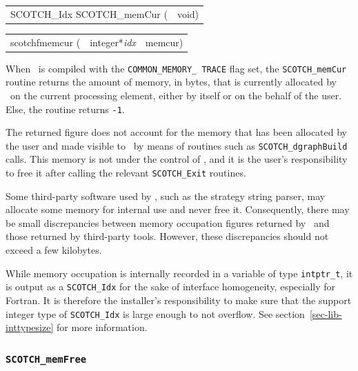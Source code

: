 \begin{itemize}
\progsyn

{\tt\begin{tabular}{l@{}l}
SCOTCH\_Idx SCOTCH\_memCur ( & void)
\end{tabular}}

{\tt\begin{tabular}{l@{}ll}
scotchfmemcur ( & integer*{\it idx} & memcur) \\

\end{tabular}}

\progdes

When \scotch\ is compiled with the {\tt COMMON\_\lbt MEMORY\_\lbt
TRACE} flag set, the {\tt SCOTCH\_memCur} routine returns the amount
of memory, in bytes, that is currently allocated by \scotch\ on the
current processing element, either by itself or on the behalf of the
user. Else, the routine returns {\tt -1}.

The returned figure does not account for the memory that has been
allocated by the user and made visible to \scotch\ by means of
routines such as {\tt SCOTCH\_\lbt dgraph\lbt Build} calls. This
memory is not under the control of \scotch, and it is the user's
responsibility to free it after calling the relevant
{\tt SCOTCH\_\lbt *\lbt Exit} routines.

Some third-party software used by \scotch, such as the strategy string
parser, may allocate some memory for internal use and never free it.
Consequently, there may be small discrepancies between memory
occupation figures returned by \scotch\ and those returned by
third-party tools. However, these discrepancies should not exceed a
few kilobytes.

While memory occupation is internally recorded in a variable of type
{\tt intptr\_\lbt t}, it is output as a {\tt SCOTCH\_\lbt Idx} for the
sake of interface homogeneity, especially for Fortran. It is therefore
the installer's responsibility to make sure that the support integer
type of {\tt SCOTCH\_\lbt Idx} is large enough to not overflow. See
section~\ref{sec-lib-inttypesize} for more information.
\end{itemize}

\subsubsection{{\tt SCOTCH\_memFree}}

